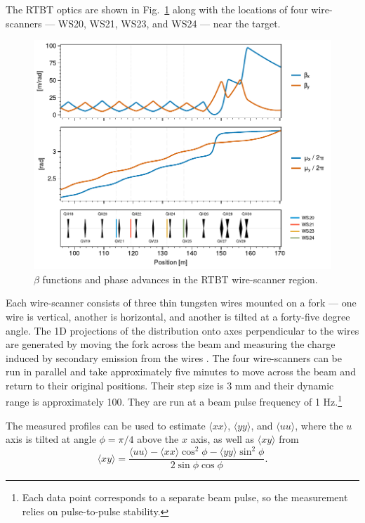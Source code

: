 The RTBT optics are shown in Fig.~\ref{fig:rtbt_optics} along with the locations of four wire-scanners — WS20, WS21, WS23, and WS24 — near the target.
%
\begin{figure}[!p]
    \includegraphics[width=\textwidth]{Images/chapter4/rtbt_optics.pdf}
    \caption{$\beta$ functions and phase advances in the RTBT wire-scanner region.}
    \label{fig:rtbt_optics}
\end{figure}
%
Each wire-scanner consists of three thin tungsten wires mounted on a fork — one wire is vertical, another is horizontal, and another is tilted at a forty-five degree angle. The 1D projections of the distribution onto axes perpendicular to the wires are generated by moving the fork across the beam and measuring the charge induced by secondary emission from the wires \cite{Henderson2014}. The four wire-scanners can be run in parallel and take approximately five minutes to move across the beam and return to their original positions. Their step size is 3 mm and their dynamic range is approximately 100. They are run at a beam pulse frequency of 1 Hz.\footnote{Each data point corresponds to a separate beam pulse, so the measurement relies on pulse-to-pulse stability.}

The measured profiles can be used to estimate $\langle{xx}\rangle$, $\langle{yy}\rangle$, and $\langle{uu}\rangle$, where the $u$ axis is tilted at angle $\phi = \pi/4$ above the $x$ axis, as well as $\langle{xy}\rangle$ from
%
\begin{equation}
    \langle{xy}\rangle = \frac{\langle{uu}\rangle - \langle{xx}\rangle \cos^2\phi - \langle{yy}\rangle \sin^2\phi}{2\sin\phi\cos\phi}
    .
\end{equation}
%

